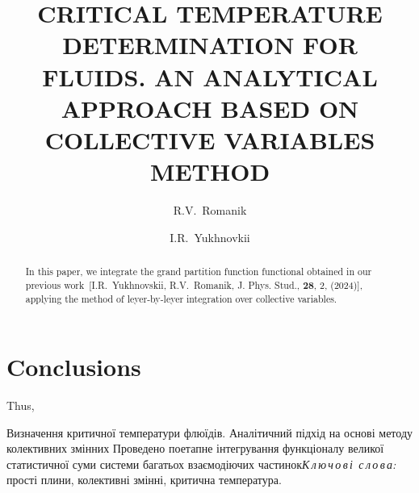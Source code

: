 \documentclass[fleqn,twoside,twocolumn,nofootinbib,showkeys]{revtex4} %
\begin{document}
\title[Critical temperature determination for fluids]%
{CRITICAL TEMPERATURE DETERMINATION FOR FLUIDS. AN ANALYTICAL APPROACH BASED ON COLLECTIVE VARIABLES METHOD}%
\author{R.V.~Romanik}%
\author{\hbox{I.R.~Yukhnovkii}}
\address{1, Svientsitskii Str., Lviv 79011, Ukraine}%

  \razd{\secvii}



\setcounter{page}{53}

\begin{abstract}
In this paper, we integrate the grand partition function functional obtained in our previous work~[I.R.~Yukhnovskii, R.V.~Romanik, J. Phys. Stud., {\bf 28}, 2, (2024)], applying the method of leyer-by-leyer integration over collective variables.
\end{abstract}


\maketitle









\section{Conclusions}

Thus, 

\appendix

\renewcommand{\theequation}{A.\arabic{equation}}
\setcounter{equation}{0}





\vskip3mm \textit{}



\vspace*{-5mm}  {Визначення критичної температури флюїдів. Аналітичний підхід на основі методу колективних змінних} {Проведено поетапне інтегрування функціоналу великої статистичної суми системи багатьох взаємодіючих частинок}{\textit{К\,л\,ю\,ч\,о\,в\,і\,
с\,л\,о\,в\,а:} прості плини, колективні змінні, критична температура.}
\end{document}
